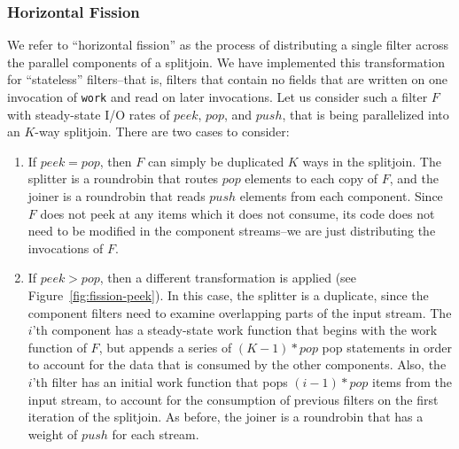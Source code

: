 \subsubsection{Horizontal Fission}

We refer to ``horizontal fission'' as the process of distributing a
single filter across the parallel components of a splitjoin.  We have
implemented this transformation for ``stateless'' filters--that is,
filters that contain no fields that are written on one invocation of
{\tt work} and read on later invocations.  Let us consider such a
filter $F$ with steady-state I/O rates of $peek$, $pop$, and $push$,
that is being parallelized into an $K$-way splitjoin.  There are two
cases to consider:
\begin{enumerate}
\item If {\bf $peek = pop$}, then $F$ can simply be duplicated $K$
ways in the splitjoin.  The splitter is a roundrobin that routes $pop$
elements to each copy of $F$, and the joiner is a roundrobin that
reads $push$ elements from each component.  Since $F$ does not peek at
any items which it does not consume, its code does not need to be
modified in the component streams--we are just distributing the
invocations of $F$.

\item If {\bf $peek > pop$}, then a different transformation is
applied (see Figure~\ref{fig:fission-peek}).  In this case, the
splitter is a duplicate, since the component filters need to examine
overlapping parts of the input stream.  The $i$'th component has a
steady-state work function that begins with the work function of $F$,
but appends a series of $(K-1)*pop$ pop statements in order to account
for the data that is consumed by the other components.  Also, the
$i$'th filter has an initial work function that pops $(i-1)*pop$ items
from the input stream, to account for the consumption of previous
filters on the first iteration of the splitjoin.  As before, the
joiner is a roundrobin that has a weight of $push$ for each stream.
\end{enumerate}

